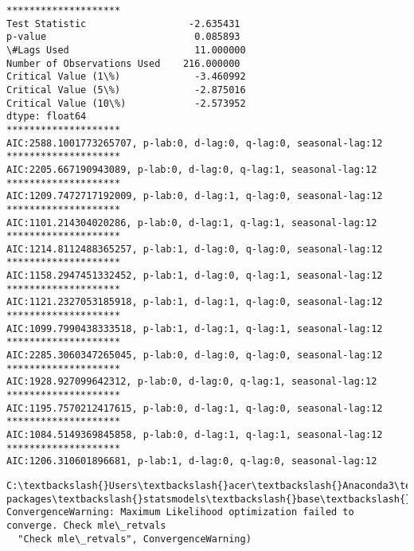 \documentclass[11pt]{article}
\begin{document}
    \begin{Verbatim}[commandchars=\\\{\}]
********************
Test Statistic                  -2.635431
p-value                          0.085893
\#Lags Used                      11.000000
Number of Observations Used    216.000000
Critical Value (1\%)             -3.460992
Critical Value (5\%)             -2.875016
Critical Value (10\%)            -2.573952
dtype: float64
********************
AIC:2588.1001773265707, p-lab:0, d-lag:0, q-lag:0, seasonal-lag:12
********************
AIC:2205.667190943089, p-lab:0, d-lag:0, q-lag:1, seasonal-lag:12
********************
AIC:1209.7472717192009, p-lab:0, d-lag:1, q-lag:0, seasonal-lag:12
********************
AIC:1101.214304020286, p-lab:0, d-lag:1, q-lag:1, seasonal-lag:12
********************
AIC:1214.8112488365257, p-lab:1, d-lag:0, q-lag:0, seasonal-lag:12
********************
AIC:1158.2947451332452, p-lab:1, d-lag:0, q-lag:1, seasonal-lag:12
********************
AIC:1121.2327053185918, p-lab:1, d-lag:1, q-lag:0, seasonal-lag:12
********************
AIC:1099.7990438333518, p-lab:1, d-lag:1, q-lag:1, seasonal-lag:12
********************
AIC:2285.3060347265045, p-lab:0, d-lag:0, q-lag:0, seasonal-lag:12
********************
AIC:1928.927099642312, p-lab:0, d-lag:0, q-lag:1, seasonal-lag:12
********************
AIC:1195.7570212417615, p-lab:0, d-lag:1, q-lag:0, seasonal-lag:12
********************
AIC:1084.5149369845858, p-lab:0, d-lag:1, q-lag:1, seasonal-lag:12
********************
AIC:1206.310601896681, p-lab:1, d-lag:0, q-lag:0, seasonal-lag:12

    \end{Verbatim}

    \begin{Verbatim}[commandchars=\\\{\}]
C:\textbackslash{}Users\textbackslash{}acer\textbackslash{}Anaconda3\textbackslash{}lib\textbackslash{}site-packages\textbackslash{}statsmodels\textbackslash{}base\textbackslash{}model.py:508: ConvergenceWarning: Maximum Likelihood optimization failed to converge. Check mle\_retvals
  "Check mle\_retvals", ConvergenceWarning)

    \end{Verbatim}
\end{document}
